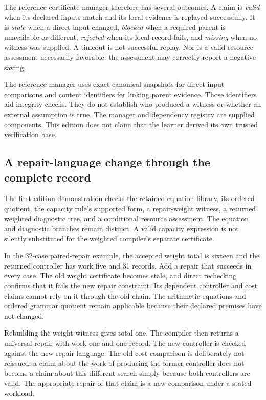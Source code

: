 \documentclass[11pt,letterpaper]{article}
\theoremstyle{plain}
\theoremstyle{definition}
\begin{document}
The reference certificate manager therefore has several outcomes. A claim is \emph{valid} when its declared inputs match and its local evidence is replayed successfully. It is \emph{stale} when a direct input changed, \emph{blocked} when a required parent is unavailable or different, \emph{rejected} when its local record fails, and \emph{missing} when no witness was supplied. A timeout is not successful replay. Nor is a valid resource assessment necessarily favorable: the assessment may correctly report a negative saving.

The reference manager uses exact canonical snapshots for direct input comparisons and content identifiers for linking parent evidence. Those identifiers aid integrity checks. They do not establish who produced a witness or whether an external assumption is true. The manager and dependency registry are supplied components. This edition does not claim that the learner derived its own trusted verification base.

\subsection{A repair-language change through the complete record}
The first-edition demonstration checks the retained equation library, its ordered quotient, the capacity rule's supported form, a repair-weight witness, a returned weighted diagnostic tree, and a conditional resource assessment. The equation and diagnostic branches remain distinct. A valid capacity expression is not silently substituted for the weighted compiler's separate certificate.

In the 32-case paired-repair example, the accepted weight total is sixteen and the returned controller has work five and 31 records. Add a repair that succeeds in every case. The old weight certificate becomes stale, and direct rechecking confirms that it fails the new repair constraint. Its dependent controller and cost claims cannot rely on it through the old chain. The arithmetic equations and ordered grammar quotient remain applicable because their declared premises have not changed.

Rebuilding the weight witness gives total one. The compiler then returns a universal repair with work one and one record. The new controller is checked against the new repair language. The old cost comparison is deliberately not reissued: a claim about the work of producing the former controller does not become a claim about this different search simply because both controllers are valid. The appropriate repair of that claim is a new comparison under a stated workload.
\end{document}
